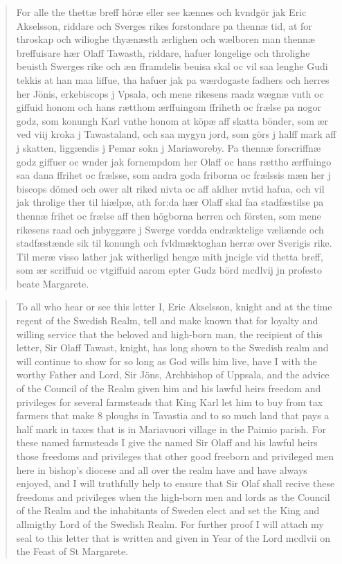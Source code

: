\documentclass[a4paper]{article}
\begin{document}
\begin{quote}
  For alle the thettæ breff höræ eller see kænnes och kvndgör jak Eric
  Akselsson, riddare och Sverges rikes forstondare pa thennæ tid, at
  for throskap och wilioghe thyænæsth ærlighen och wælboren man thennæ
  breffuisare hær Olaff Tawasth, riddare, hafuer longelige och
  throlighe beuisth Swerges rike och æn fframdelis beuisa skal oc vil
  saa lenghe Gudi tekkis at han maa liffue, tha hafuer jak pa
  wærdogaste fadhers och herres her Jönis, erkebiscops j Vpsala, och
  mene rikesens raadz wægnæ vnth oc giffuid honom och hans rætthom
  ærffuingom ffriheth oc frælse pa nogor godz, som konungh Karl vnthe
  honom at köpæ aff skatta bönder, som ær ved viij kroka j
  Tawastaland, och saa mygyn jord, som görs j halff mark aff j
  skatten, liggændis j Pemar sokn j Mariaworeby. Pa thennæ forscriffnæ
  godz giffuer oc wnder jak fornempdom her Olaff oc hans rættho
  ærffuingo saa dana ffrihet oc frælsse, som andra goda friborna oc
  frælssis mæn her j biscops dömed och ower alt riked nivta oc aff
  aldher nvtid hafua, och vil jak throlige ther til hiælpæ, ath for:da
  hær Olaff skal faa stadfæstilse pa thennæ frihet oc frælse aff then
  högborna herren och försten, som mene rikesens raad och jnbyggære j
  Swerge vordda endræktelige væliænde och stadfæstænde sik til konungh
  och fvldmæktoghan herræ over Sverigis rike. Til meræ visso lather
  jak witherligd hengæ mith jncigle vid thetta breff, som ær scriffuid
  oc vtgiffuid aarom epter Gudz börd mcdlvij jn profesto beate
  Margarete.
\end{quote}


\begin{quote}
  To all who hear or see this letter I, Eric Akselsson, knight and at
  the time regent of the Swedish Realm, tell and make known that for
  loyalty and willing service that the beloved and high-born man, the
  recipient of this letter, Sir Olaff Tawast, knight, has long shown
  to the Swedish realm and will continue to show for so long as God
  wills him live, have I with the worthy Father and Lord, Sir Jöns,
  Archbishop of Uppsala, and the advice of the Council of the Realm
  given him and his lawful heirs freedom and privileges for several
  farmsteads that King Karl let him to buy from tax farmers that make
  8 ploughs in Tavastia and to so much land that pays a half mark in
  taxes that is in Mariavuori village in the Paimio parish. For these
  named farmsteads I give the named Sir Olaff and his lawful heirs
  those freedoms and privileges that other good freeborn and
  privileged men here in bishop's diocese and all over the realm have
  and have always enjoyed, and I will truthfully help to ensure that
  Sir Olaf shall recive these freedoms and privileges when the
  high-born men and lords as the Council of the Realm and the
  inhabitants of Sweden elect and set the King and allmigthy Lord of
  the Swedish Realm. For further proof I will attach my seal to
  this letter that is written and given in Year of the Lord mcdlvii on
  the Feast of St Margarete.
  

\end{quote}
\end{document}
